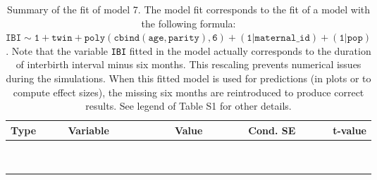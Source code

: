 \begin{table}

\caption{\label{tab:tab7}Summary of the fit of model 7. The model fit corresponds to the fit of a model with the following formula: {\small$\mathtt{IBI \sim 1 + twin + poly(cbind(age, parity), 6) + (1 | maternal\_id) + (1 | pop)}$}. Note that the variable \texttt{IBI} fitted in the model actually corresponds to the duration of interbirth interval minus six months. This rescaling prevents numerical issues during the simulations. When this fitted model is used for predictions (in plots or to compute effect sizes), the missing six months are reintroduced to produce correct results. See legend of Table S1 for other details.}
\centering
\fontsize{8}{10}\selectfont
\begin{tabular}[t]{>{\raggedright\arraybackslash}p{3cm}>{\raggedright\arraybackslash}p{5cm}rrr}
\toprule
Type & Variable & Value & Cond. SE & t-value\\
\midrule
\cellcolor{gray!6}{fixed effects} & \cellcolor{gray!6}{$\beta_1$} & \cellcolor{gray!6}{3.44} & \cellcolor{gray!6}{0.0579} & \cellcolor{gray!6}{59.5}\\
\cellcolor{gray!6}{} & \cellcolor{gray!6}{$\beta_{\mathtt{twin}}$} & \cellcolor{gray!6}{-0.0328} & \cellcolor{gray!6}{0.015} & \cellcolor{gray!6}{-2.18}\\
\cellcolor{gray!6}{} & \cellcolor{gray!6}{$\beta_{\mathtt{age}}$} & \cellcolor{gray!6}{-63.6} & \cellcolor{gray!6}{21.9} & \cellcolor{gray!6}{-2.9}\\
\cellcolor{gray!6}{} & \cellcolor{gray!6}{$\beta_{\mathtt{age}^2}$} & \cellcolor{gray!6}{39.7} & \cellcolor{gray!6}{19.6} & \cellcolor{gray!6}{2.02}\\
\cellcolor{gray!6}{} & \cellcolor{gray!6}{$\beta_{\mathtt{age}^3}$} & \cellcolor{gray!6}{-31.3} & \cellcolor{gray!6}{13} & \cellcolor{gray!6}{-2.41}\\
\cellcolor{gray!6}{} & \cellcolor{gray!6}{$\beta_{\mathtt{age}^4}$} & \cellcolor{gray!6}{15} & \cellcolor{gray!6}{6.31} & \cellcolor{gray!6}{2.38}\\
\cellcolor{gray!6}{} & \cellcolor{gray!6}{$\beta_{\mathtt{age}^5}$} & \cellcolor{gray!6}{-5} & \cellcolor{gray!6}{2.42} & \cellcolor{gray!6}{-2.07}\\
\cellcolor{gray!6}{} & \cellcolor{gray!6}{$\beta_{\mathtt{age}^6}$} & \cellcolor{gray!6}{4.01} & \cellcolor{gray!6}{1.01} & \cellcolor{gray!6}{3.95}\\
\cellcolor{gray!6}{} & \cellcolor{gray!6}{$\beta_{\mathtt{parity}}$} & \cellcolor{gray!6}{121} & \cellcolor{gray!6}{40.7} & \cellcolor{gray!6}{2.96}\\

\end{tabular}
\end{table}
